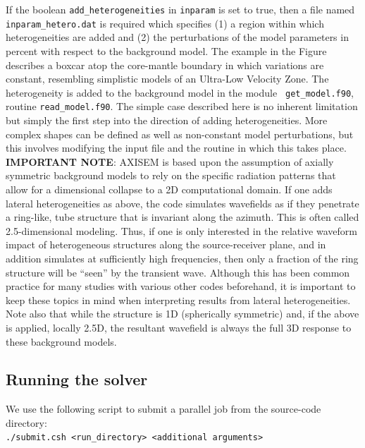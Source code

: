 \documentclass[11pt,letter,fleqn,english,notitlepage]{article}
\begin{document}
If the boolean {\tt add\_heterogeneities} in {\tt inparam} is set to true, then
a file named {\tt inparam\_hetero.dat} is required which specifies (1) a region
within which heterogeneities are added and (2) the perturbations of the model
parameters in percent with respect to the background model. The example in the
Figure describes a boxcar atop the core-mantle boundary in which variations are
constant, resembling simplistic models of an Ultra-Low Velocity Zone. The
heterogeneity is added to the background model in the module {\tt
get\_model.f90}, routine {\tt read\_model.f90}. The simple case described here
is no inherent limitation but simply the first step into the direction of
adding heterogeneities. More complex shapes can be defined as well as
non-constant model perturbations, but this involves modifying the input file
and the routine in which this takes place. \\

\noindent \textbf{IMPORTANT NOTE}: AXISEM is based upon the assumption of
axially symmetric background models to rely on the specific radiation
patterns that allow for a dimensional collapse to a 2D computational domain. If
one adds lateral heterogeneities as above, the code simulates wavefields as if
they penetrate a ring-like, tube structure that is invariant along the azimuth.
This is often called 2.5-dimensional modeling. Thus, if one is only interested
in the relative waveform impact of heterogeneous structures along the
source-receiver plane, and in addition simulates at sufficiently high
frequencies, then only a fraction of the ring structure will be ``seen'' by the
transient wave. Although this has been common practice for many studies with
various other codes beforehand, it is important to keep these topics in mind
when interpreting results from lateral heterogeneities. Note also that while
the structure is 1D (spherically symmetric) and, if the above is applied,
locally 2.5D, the resultant wavefield is always the full 3D response to these
background models.


\subsection{Running the solver}
We use the following script to submit a parallel job from the source-code directory:\\
{\tt ./submit.csh <run\_directory> <additional arguments>}\\
\end{document}

